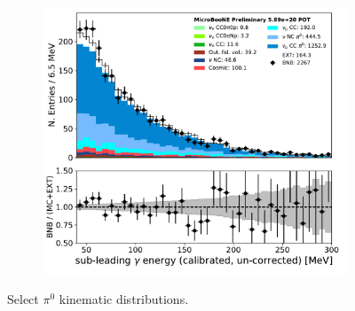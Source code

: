 \begin{figure}[H]
\begin{center}
\begin{subfigure}[b]{0.3\textwidth}
    \caption{}
    \end{subfigure}
    \begin{subfigure}[b]{0.3\textwidth}
    \centering
    \includegraphics[width=1.00\textwidth]{pi0/kinematics/pi0_energy2_Y_03112020_ALL_scaled.pdf}
    \caption{}
    \end{subfigure}
\caption{Select $\pi^0$ kinematic distributions.}
\label{fig:pi0:kinematics:B}
\end{center}
\end{figure}

